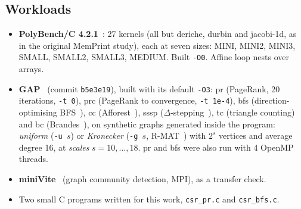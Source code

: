 \documentclass[11pt]{article}
\newcommand{\memprint}{MemPrint}
\newcommand{\term}[1]{\emph{#1}}
\newcommand{\code}[1]{\texttt{#1}}
\begin{document}
\subsection{Workloads}
\begin{itemize}
\item \textbf{PolyBench/C 4.2.1}~\cite{polybench}: 27 kernels (all but deriche, durbin and jacobi-1d, as in the
original \memprint{} study), each at seven sizes: MINI, MINI2, MINI3, SMALL, SMALL2, SMALL3, MEDIUM. Built
\code{-O0}. Affine loop nests over arrays.
\item \textbf{GAP}~\cite{beamer2015gap} (commit \code{b5e3e19}), built with its default \code{-O3}: pr
(PageRank, 20 iterations, \code{-t 0}), prc (PageRank to convergence, \code{-t 1e-4}), bfs (direction-optimising
BFS~\cite{beamer2012dobfs}), cc (Afforest~\cite{sutton2018afforest}), sssp
($\Delta$-stepping~\cite{meyer2003delta}), tc (triangle counting) and bc (Brandes~\cite{brandes2001}), on
synthetic graphs generated inside the program: \term{uniform} (\code{-u $s$}) or \term{Kronecker}
(\code{-g $s$}, R-MAT~\cite{chakrabarti2004rmat,leskovec2010kronecker}) with $2^s$ vertices and average degree 16,
at \term{scales} $s=10,\dots,18$. pr and bfs were also run with 4 OpenMP threads.
\item \textbf{miniVite}~\cite{minivite} (graph community detection, MPI), as a transfer check.
\item Two small C programs written for this work, \code{csr\_pr.c} and \code{csr\_bfs.c}.
\end{itemize}
\end{document}
